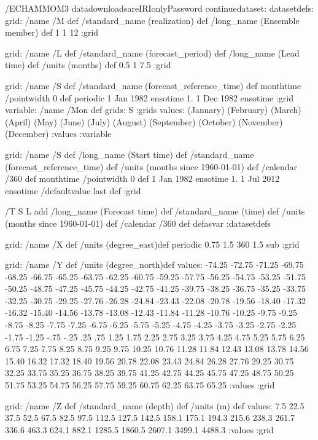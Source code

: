 \begin{ingrid}
/ECHAMMOM3  datadownloadsareIRIonlyPassword
continuedataset:
datasetdefs:
grid:
/name /M def
/standard_name (realization) def
/long_name (Ensemble member) def
1 1 12
:grid

grid:
/name /L def
/standard_name (forecast_period) def
/long_name (Lead time) def
/units (months) def
0.5 1 7.5
:grid

grid:
/name /S def
/standard_name (forecast_reference_time) def
monthtime
/pointwidth 0 def
periodic
1 Jan 1982 ensotime
1.
1 Dec 1982 ensotime
:grid
variable:
/name /Mon def
grids: S :grids
values:
(January)
(February)
(March)
(April)
(May)
(June)
(July)
(August)
(September)
(October)
(November)
(December)
:values
:variable

grid:
/name /S def
/long_name (Start time) def
/standard_name (forecast_reference_time) def
/units (months since 1960-01-01) def
/calendar /360 def
monthtime
/pointwidth 0 def 
1 Jan 1982 ensotime
1.
1 Jul 2012 ensotime
/defaultvalue {last} def
:grid

/T { 
S L add
/long_name (Forecast time) def
/standard_name (time) def
/units (months since 1960-01-01) def
/calendar /360 def
 }defasvar
:datasetdefs

grid:
/name /X def
/units (degree_east)def
 periodic
 0.75 1.5 360 1.5 sub
:grid

grid:
/name /Y def
/units (degree_north)def
values:
-74.25 -72.75 -71.25 -69.75 -68.25 -66.75 -65.25 
-63.75 -62.25 -60.75 -59.25 -57.75 -56.25 -54.75 -53.25 -51.75 
-50.25 -48.75 -47.25 -45.75 -44.25 -42.75 -41.25 -39.75 -38.25 
-36.75 -35.25 -33.75 -32.25 -30.75 -29.25 -27.76 -26.28 
-24.84 -23.43 -22.08 -20.78 -19.56 -18.40 -17.32 
-16.32 -15.40 -14.56 -13.78 -13.08 -12.43 -11.84 -11.28 
-10.76 -10.25 -9.75 -9.25  -8.75 -8.25 -7.75 
-7.25 -6.75 -6.25 -5.75 -5.25 -4.75 -4.25 -3.75 
-3.25 -2.75 -2.25 -1.75 -1.25 -.75 -.25 .25 
.75 1.25 1.75 2.25 2.75 3.25 3.75 4.25 4.75 
5.25 5.75  6.25 6.75 7.25 7.75 8.25 8.75 9.25 9.75 
10.25 10.76 11.28 11.84 12.43 13.08 13.78 14.56 
15.40 16.32 17.32 18.40 19.56 20.78 22.08 
23.43 24.84 26.28 27.76 29.25 30.75 32.25 33.75 35.25 
36.75 38.25 39.75 41.25 42.75 44.25 45.75 47.25 48.75 50.25 51.75 
53.25 54.75 56.25 57.75 59.25 60.75 62.25 63.75 65.25
:values
:grid

grid:
/name /Z def
/standard_name (depth) def
/units (m) def
values:
7.5 22.5 37.5 52.5 67.5 82.5 97.5 112.5 127.5 142.5 158.1 
175.1 194.3 215.6 238.3 261.7 336.6 463.3 624.1 882.1 1285.5 1860.5 
2607.1 3499.1 4488.3
:values
:grid


\end{ingrid}
